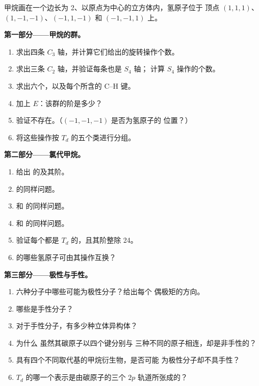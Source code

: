 \begin{problem}
\label{pb:b3:point-groups:1}
甲烷画在一个边长为 2、以原点为中心的立方体内，氢原子位于
顶点 $(1,1,1)$、$(1,-1,-1)$、$(-1,1,-1)$ 和 $(-1,-1,1)$ 上。

\medskip\noindent\textbf{第一部分——甲烷的群。}
\begin{enumerate}
  \item 求出四条 $C_3$ 轴，并计算它们给出的旋转操作个数。
  \item 求出三条 $C_2$ 轴，并验证每条也是 $S_4$ 轴；
        计算 $S_4$ 操作的个数。
  \item 求出六个，以及每个所含的 C--H 键。
  \item 加上 $E$：该群的阶是多少？
  \item 验证不存在。（$(-1,-1,-1)$ 是否为氢原子的
        位置？）
  \item 将这些操作按 $T_d$ 的五个类进行分组。
\end{enumerate}

\medskip\noindent\textbf{第二部分——氯代甲烷。}
\begin{enumerate}[resume]
  \item 给出  的及其阶。
  \item {} 的同样问题。
  \item {} 和  的同样问题。
  \item {} 和  的同样问题。
  \item 验证每个都是 $T_d$ 的，且其阶整除 24。
  \item {} 的哪些氢原子可由其操作互换？
\end{enumerate}

\medskip\noindent\textbf{第三部分——极性与手性。}
\begin{enumerate}[resume]
  \item 六种分子中哪些可能为极性分子？给出每个
        偶极矩的方向。
  \item 哪些是手性分子？
  \item 对于手性分子，有多少种立体异构体？
  \item 为什么  虽然其碳原子以四个键分别与
        三种不同的原子相连，却是非手性的？
  \item 具有四个不同取代基的甲烷衍生物，是否可能
        为极性分子却不具手性？
  \item $T_d$ 的哪一个表示是由碳原子的三个
        $2p$ 轨道所张成的？
\end{enumerate}


\end{problem}
